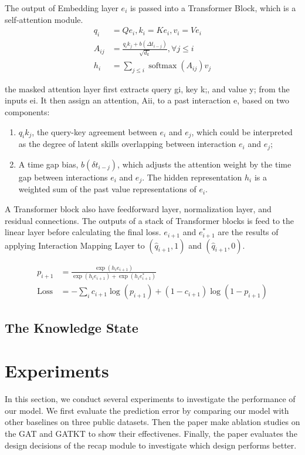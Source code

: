 The output of Embedding layer $e_i$ is passed into a Transformer Block, which is a self-attention module.
\begin{align}
	q_{i}   & =Q e_{i}, k_{i}=K e_{i}, v_{i}=V e_{i}                                           \\
	A_{i j} & =\frac{q_{i} k_{j}+b\left(\Delta t_{i-j}\right)}{\sqrt{d_{k}}}, \forall j \leq i \\
	h_{i}   & =\sum_{j \leq i} \operatorname{softmax}\left(A_{i j}\right) v_{j}
\end{align}

the masked attention layer first extracts query gi, key k;, and value y; from the inputs ei. It then assign an attention, Aii, to a past interaction e, based on two components:
\begin{enumerate}
	\item $q_i k_j$, the query-key agreement between $e_i$ and $e_j$, which could be interpreted as the degree of latent skills overlapping between interaction $e_i$ and $e_j$;
	\item A time gap bias, $b(\delta t_{i-j})$, which adjusts the attention weight by the time gap between interactions $e_i$ and $e_j$. The hidden representation $h_i$ is a weighted sum of the past value representations of $e_i$.
\end{enumerate}

A Transformer block also have feedforward layer, normalization layer, and residual connections. The outputs of a stack of Transformer blocks is feed to the linear layer before calculating the final loss. $e_{i+1}$ and $e_{i+1}^*$ are the results of applying Interaction Mapping Layer to $(\hat{q}_{i+1}, 1)$ and $(\hat{q}_{i+1}, 0)$.

\begin{align}
	p_{i+1}     & =\frac{\exp \left(h_{i} e_{i+1}\right)}{\exp \left(h_{i} e_{i+1}\right)+\exp \left(h_{i} e_{i+1}^{*}\right)} \\
	\text{Loss} & =-\sum_{i} c_{i+1} \log \left(p_{i+1}\right)+\left(1-c_{i+1}\right) \log \left(1-p_{i+1}\right)
\end{align}


\subsection{The Knowledge State }


\section{Experiments}
In this section, we conduct several experiments to investigate the performance of our model. We first evaluate the prediction error by comparing our model with other baselines on three public datasets. Then the paper make ablation studies on the GAT and GATKT to show their effectivenes. Finally, the paper evaluates the design decisions of the recap module to investigate which design performs better.
